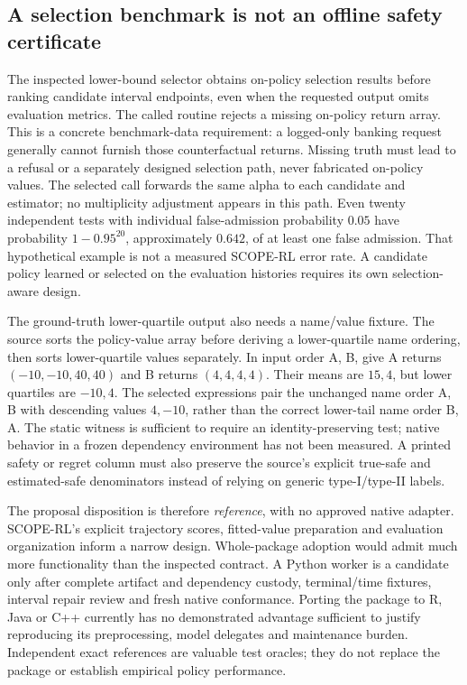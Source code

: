 \subsection{A selection benchmark is not an offline safety certificate}
\label{exec23:scope-rl-decision}
The inspected lower-bound selector obtains on-policy selection results before
ranking candidate interval endpoints, even when the requested output omits
evaluation metrics. The called routine rejects a missing on-policy return
array. This is a concrete benchmark-data requirement: a logged-only banking
request generally cannot furnish those counterfactual returns. Missing truth
must lead to a refusal or a separately designed selection path, never fabricated
on-policy values. The selected call forwards the same alpha to each candidate
and estimator; no multiplicity adjustment appears in this path. Even twenty
independent tests with individual false-admission probability $0.05$ have
probability $1-0.95^{20}$, approximately $0.642$, of at least one false admission.
That hypothetical example is not a measured SCOPE-RL error rate. A candidate
policy learned or selected on the evaluation histories requires its own
selection-aware design. \cite{exec23_scope_rl_sources,exec23_scope_rl_reference}

The ground-truth lower-quartile output also needs a name/value fixture. The
source sorts the policy-value array before deriving a lower-quartile name
ordering, then sorts lower-quartile values separately. In input order A, B,
give A returns $(-10,-10,40,40)$ and B returns $(4,4,4,4)$. Their means are
$15,4$, but lower quartiles are $-10,4$. The selected expressions pair the
unchanged name order A, B with descending values $4,-10$, rather than the
correct lower-tail name order B, A. The static witness is sufficient to require
an identity-preserving test; native behavior in a frozen dependency environment
has not been measured. A printed safety or regret column must also preserve the
source's explicit true-safe and estimated-safe denominators instead of relying
on generic type-I/type-II labels. \cite{exec23_scope_rl_sources,exec23_scope_rl_reference}

The proposal disposition is therefore \emph{reference}, with no approved native
adapter. SCOPE-RL's explicit trajectory scores, fitted-value preparation and
evaluation organization inform a narrow design. Whole-package adoption would
admit much more functionality than the inspected contract. A Python worker is
a candidate only after complete artifact and dependency custody, terminal/time
fixtures, interval repair review and fresh native conformance. Porting the
package to R, Java or C++ currently has no demonstrated advantage sufficient to
justify reproducing its preprocessing, model delegates and maintenance burden.
Independent exact references are valuable test oracles; they do not replace the
package or establish empirical policy performance.

